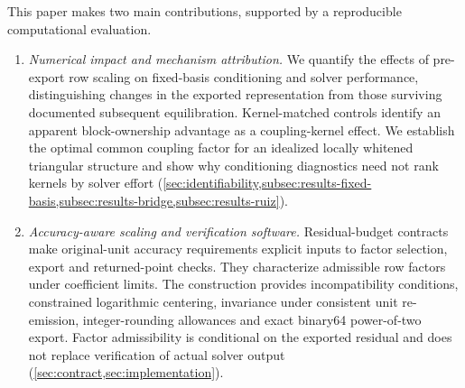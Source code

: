 \documentclass[11pt]{article}
\theoremstyle{definition}
\theoremstyle{remark}
\begin{document}
This paper makes two main contributions, supported by a reproducible computational evaluation.
\begin{enumerate}[label=(\Alph*),leftmargin=*,itemsep=2pt,topsep=3pt]
\item \emph{Numerical impact and mechanism attribution.} We quantify the effects of
pre-export row scaling on fixed-basis conditioning and solver performance, distinguishing
changes in the exported representation from those surviving documented subsequent
equilibration. Kernel-matched controls identify an apparent block-ownership advantage as
a coupling-kernel effect. We establish the optimal common coupling factor for an idealized
locally whitened triangular structure and show why conditioning diagnostics need not rank
kernels by solver effort
(\cref{sec:identifiability,subsec:results-fixed-basis,subsec:results-bridge,subsec:results-ruiz}).
\item \emph{Accuracy-aware scaling and verification software.} Residual-budget contracts
make original-unit accuracy requirements explicit inputs to factor selection, export
and returned-point checks. They characterize admissible row factors under coefficient limits.
The construction provides incompatibility conditions, constrained logarithmic centering,
invariance under consistent unit re-emission, integer-rounding allowances and exact
binary64 power-of-two export. Factor admissibility is conditional
on the exported residual and does not replace verification of actual solver output
(\cref{sec:contract,sec:implementation}).
\end{enumerate}
\end{document}
